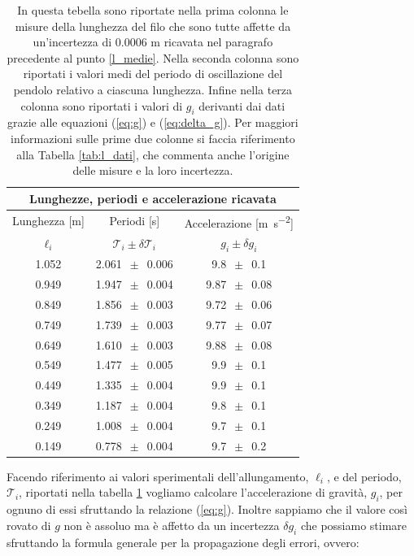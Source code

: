 \begin{table}
    \centering
    \begin{tabular}{c c c}
        \multicolumn{3}{c}{\textbf{Lunghezze, periodi e accelerazione ricavata}} \\
        \toprule
        Lunghezza [\si{\metre}] & Periodi [\si{\second}] & Accelerazione [\si{\metre\per\square\second}] \\ %
        $\ell_i$ & $\mathcal{T}_i \pm \delta\mathcal{T}_i$ & $g_i \pm \delta g_i$ \\
        \midrule
			1.052 & 2.061 $\,\pm\,$ 0.006 & 9.8 $\,\pm\,$ 0.1 \\
			0.949 & 1.947 $\,\pm\,$ 0.004 & 9.87 $\,\pm\,$ 0.08 \\
			0.849 & 1.856 $\,\pm\,$ 0.003 & 9.72 $\,\pm\,$ 0.06 \\
			0.749 & 1.739 $\,\pm\,$ 0.003 & 9.77 $\,\pm\,$ 0.07 \\
			0.649 & 1.610 $\,\pm\,$ 0.003 & 9.88 $\,\pm\,$ 0.08 \\
			0.549 & 1.477 $\,\pm\,$ 0.005 & 9.9 $\,\pm\,$ 0.1 \\
			0.449 & 1.335 $\,\pm\,$ 0.004 & 9.9 $\,\pm\,$ 0.1 \\
			0.349 & 1.187 $\,\pm\,$ 0.004 & 9.8 $\,\pm\,$ 0.1 \\
			0.249 & 1.008 $\,\pm\,$ 0.004 & 9.7 $\,\pm\,$ 0.1 \\
			0.149 & 0.778 $\,\pm\,$ 0.004 & 9.7 $\,\pm\,$ 0.2 \\
		\bottomrule
    \end{tabular}
    \caption{In questa tebella sono riportate nella prima colonna le misure della lunghezza del filo che sono tutte affette da un'incertezza di 0.0006 m ricavata nel paragrafo precedente al punto \ref{l_medie}. Nella seconda colonna sono riportati i valori medi del periodo di oscillazione del pendolo relativo a ciascuna lunghezza. Infine nella terza colonna sono riportati i valori di $g_i$ derivanti dai dati grazie alle equazioni (\ref{eq:g}) e (\ref{eq:delta_g}). Per maggiori informazioni sulle prime due colonne si faccia riferimento alla Tabella \ref{tab:l_dati}, che commenta anche l'origine delle misure e la loro incertezza.}
    \label{tab:calcolo_g}
\end{table}

Facendo riferimento ai valori sperimentali dell'allungamento, $\ell_i$, e del periodo, $\mathcal{T}_i$, riportati nella tabella \ref{tab:calcolo_g} vogliamo calcolare l'accelerazione di gravità, $g_i$, per ognuno di essi sfruttando la relazione (\ref{eq:g}). Inoltre sappiamo che il valore così rovato di $g$ non è assoluo ma è affetto da un incertezza $\delta g_i$ che possiamo stimare sfruttando la formula generale per la propagazione degli errori, ovvero:

